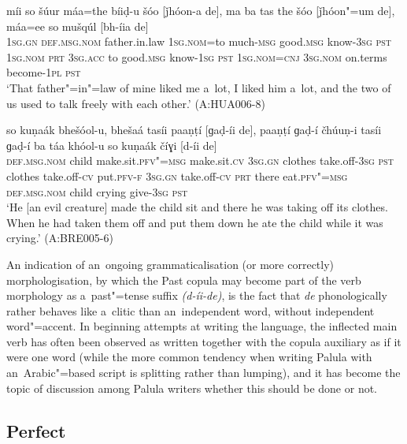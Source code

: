 \begin{exe}
\ex
\label{ex:9-20}
\gll míi so šúur máa=the bíiḍ-u šóo [ǰhóon-a de], ma ba tas the šóo [ǰhóon"=um de], máa=ee so mušqúl [bh-íia de] \\
\textsc{1sg.gn} \textsc{def.msg.nom} father.in.law \textsc{1sg.nom=}to much-\textsc{msg} good.\textsc{msg} know-\textsc{3sg} \textsc{pst} \textsc{1sg.nom} \textsc{prt} \textsc{3sg.acc}  to good.\textsc{msg} know-\textsc{1sg } \textsc{pst } \textsc{1sg.nom=cnj}  \textsc{3sg.nom} on.terms become-\textsc{1pl} \textsc{pst} \\
\glt `That father"=in"=law of mine liked me a~lot, I liked him a~lot, and the two of us used to talk freely with each other.' (A:HUA006-8)

\ex
\label{ex:9-21}
\gll so kuṇaák bhešóol-u, bhešaá tasíi paaṇṭí [ɡaḍ-íi de], paaṇṭí ɡaḍ-í čhúuṇ-i tasíi ɡaḍ-í ba táa khóol-u so kuṇaák číɣi [d-íi de] \\
\textsc{def.msg.nom} child make.sit.\textsc{pfv"=msg} make.sit.\textsc{cv} \textsc{3sg.gn}  clothes take.off-\textsc{3sg } \textsc{pst} clothes take.off-\textsc{cv} put.\textsc{pfv-f}  \textsc{3sg.gn} take.off-\textsc{cv} \textsc{prt} there eat.\textsc{pfv"=msg}  \textsc{def.msg.nom} child crying give-\textsc{3sg} \textsc{pst} \\
\glt `He [an evil creature] made the child sit and there he was taking off its clothes. When he had taken them off and put them down he ate the child while it was crying.' (A:BRE005-6)
\end{exe}

An indication of an~ongoing grammaticalisation (or more correctly) morphologisation, by which the Past copula may become part of the verb morphology as a~past"=tense suffix \textit{(d-íi-de)}, is the fact that \textit{de} phonologically rather behaves like a~clitic than an~independent word, without independent word"=accent. In beginning attempts at writing the language, the inflected main verb has often been observed as written together with the copula auxiliary as if it were one word (while the more common tendency when writing Palula with an~Arabic"=based script is splitting rather than lumping), and it has become the topic of discussion among Palula writers whether this should be done or not. 


\subsection{Perfect}
\label{subsec:9-1-7}

